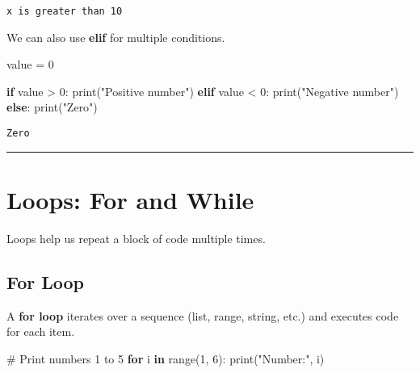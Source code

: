 \documentclass[
  11pt,
  letterpaper,
]{book}
\newenvironment{Shaded}{\begin{snugshade}}{\end{snugshade}}
\newcommand{\BuiltInTok}[1]{\textcolor[rgb]{0.00,0.23,0.31}{#1}}
\newcommand{\CommentTok}[1]{\textcolor[rgb]{0.37,0.37,0.37}{#1}}
\newcommand{\ControlFlowTok}[1]{\textcolor[rgb]{0.00,0.23,0.31}{\textbf{#1}}}
\newcommand{\DecValTok}[1]{\textcolor[rgb]{0.68,0.00,0.00}{#1}}
\newcommand{\KeywordTok}[1]{\textcolor[rgb]{0.00,0.23,0.31}{\textbf{#1}}}
\newcommand{\NormalTok}[1]{\textcolor[rgb]{0.00,0.23,0.31}{#1}}
\newcommand{\OperatorTok}[1]{\textcolor[rgb]{0.37,0.37,0.37}{#1}}
\newcommand{\StringTok}[1]{\textcolor[rgb]{0.13,0.47,0.30}{#1}}
\begin{document}
\begin{verbatim}
x is greater than 10
\end{verbatim}

We can also use \textbf{elif} for multiple conditions.

\begin{Shaded}
\begin{Highlighting}[]
\NormalTok{value }\OperatorTok{=} \DecValTok{0}

\ControlFlowTok{if}\NormalTok{ value }\OperatorTok{\textgreater{}} \DecValTok{0}\NormalTok{:}
    \BuiltInTok{print}\NormalTok{(}\StringTok{"Positive number"}\NormalTok{)}
\ControlFlowTok{elif}\NormalTok{ value }\OperatorTok{\textless{}} \DecValTok{0}\NormalTok{:}
    \BuiltInTok{print}\NormalTok{(}\StringTok{"Negative number"}\NormalTok{)}
\ControlFlowTok{else}\NormalTok{:}
    \BuiltInTok{print}\NormalTok{(}\StringTok{"Zero"}\NormalTok{)}
\end{Highlighting}
\end{Shaded}

\begin{verbatim}
Zero
\end{verbatim}

\begin{center}\rule{0.5\linewidth}{0.5pt}\end{center}

\section{Loops: For and While}\label{loops-for-and-while}

Loops help us repeat a block of code multiple times.

\subsection{For Loop}\label{for-loop}

A \textbf{for loop} iterates over a sequence (list, range, string, etc.)
and executes code for each item.

\begin{Shaded}
\begin{Highlighting}[]
\CommentTok{\# Print numbers 1 to 5}
\ControlFlowTok{for}\NormalTok{ i }\KeywordTok{in} \BuiltInTok{range}\NormalTok{(}\DecValTok{1}\NormalTok{, }\DecValTok{6}\NormalTok{):}
    \BuiltInTok{print}\NormalTok{(}\StringTok{"Number:"}\NormalTok{, i)}
\end{Highlighting}
\end{Shaded}
\end{document}
